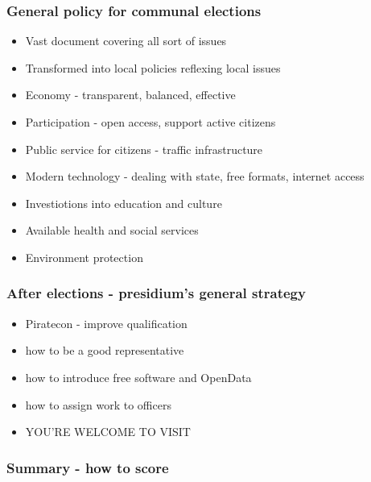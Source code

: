 \begin{frame}
	\frametitle{General policy for communal elections}
	\begin{itemize}
		\item Vast document covering all sort of issues
		\item Transformed into local policies reflexing local issues
		\item Economy - transparent, balanced, effective
		\item Participation - open access, support active citizens
		\item Public service for citizens - traffic infrastructure
		\item Modern technology - dealing with state, free formats, internet access
		\item Investiotions into education and culture
		\item Available health and social services
		\item Environment protection
	\end{itemize}
\end{frame}
\begin{frame}
	\frametitle{After elections - presidium's general strategy}
	\begin{itemize}
		\item Piratecon - improve qualification
		\item how to be a good representative
		\item how to introduce free software and OpenData
		\item how to assign work to officers
		\item YOU'RE WELCOME TO VISIT
	\end{itemize}
\end{frame}
\begin{frame}
	\frametitle{Summary - how to score}
\end{frame}